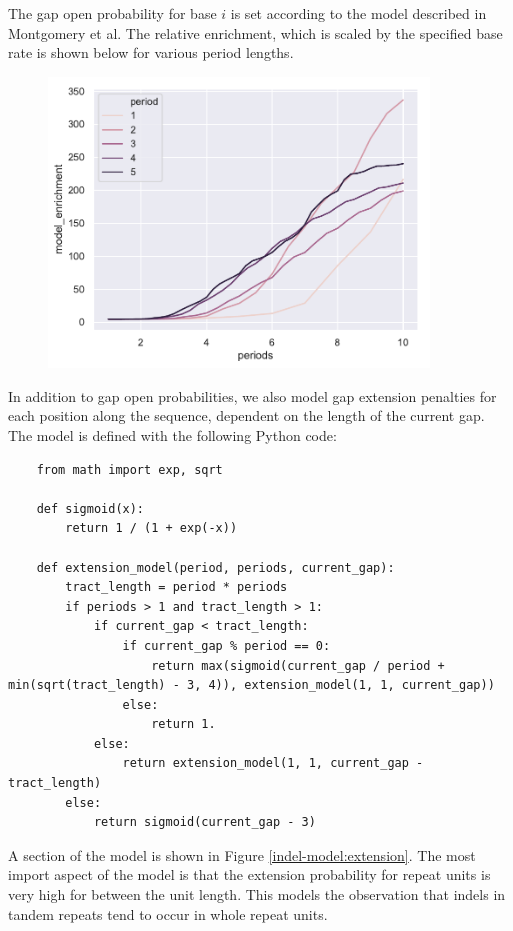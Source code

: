 \documentclass{article}
\begin{document}
The gap open probability for base $i$ is set according to the model described in Montgomery et al. The relative enrichment, which is scaled by the specified base rate is shown below for various period lengths.
 
\begin{figure}[ht]
 \centering
 \includegraphics[width=0.9\textwidth]{figures/indel-open-model}
\end{figure}

In addition to gap open probabilities, we also model gap extension penalties for each position along the sequence, dependent on the length of the current gap. The model is defined with the following Python code:

\begin{lstlisting}
	from math import exp, sqrt
	
	def sigmoid(x):
	    return 1 / (1 + exp(-x))
	
	def extension_model(period, periods, current_gap):
	    tract_length = period * periods
	    if periods > 1 and tract_length > 1:
	        if current_gap < tract_length:
	            if current_gap % period == 0:
	                return max(sigmoid(current_gap / period + min(sqrt(tract_length) - 3, 4)), extension_model(1, 1, current_gap))
	            else:
	                return 1.
	        else:
	            return extension_model(1, 1, current_gap - tract_length)
	    else:
	        return sigmoid(current_gap - 3)
\end{lstlisting}

A section of the model is shown in Figure \ref{indel-model:extension}. The most import aspect of the model is that the extension probability for repeat units is very high for between the unit length. This models the observation that indels in tandem repeats tend to occur in whole repeat units.
\end{document}
